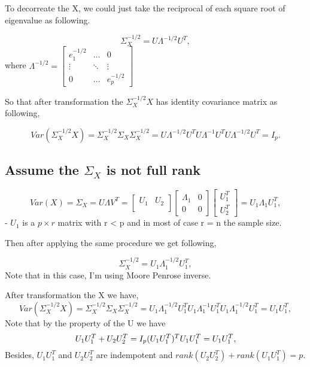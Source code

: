 \documentclass[]{article}
\begin{document}
To decorreate the X, we could just take the reciprocal of each square
root of eigenvalue as following.

\[
  \Sigma^{-1/2}_X = U\Lambda^{-1/2}U^T,
\] where
\(\Lambda^{-1/2} = \begin{bmatrix}  e_1^{-1/2} & \dots & 0 \\  \vdots & \ddots & \vdots \\  0 & \dots & e_p^{-1/2}  \end{bmatrix}\)

So that after transformation the \(\Sigma^{-1/2}_X X\) has identity
covariance matrix as following,

\[
  Var(\Sigma^{-1/2}_X X) = \Sigma^{-1/2}_X \Sigma_X\Sigma^{-1/2}_X = U\Lambda^{-1/2}U^T U\Lambda^{-1}U^T U\Lambda^{-1/2}U^T = I_p.
\]

\subsection{\texorpdfstring{Assume the \(\Sigma_X\) is not full
rank}{Assume the \textbackslash{}Sigma\_X is not full rank}}\label{assume-the-sigma_x-is-not-full-rank}

\[
  Var(X) = \Sigma_X = U\Lambda V^T =
                        \begin{bmatrix}
                         U_1 & U_2\\
                        \end{bmatrix}
                        \begin{bmatrix}
                        \Lambda_1 & 0\\
                        0 & 0
                        \end{bmatrix}
                        \begin{bmatrix}
                        U_1^T \\
                        U_2^T
                        \end{bmatrix} = U_1\Lambda_1U_1^T,
\] - \(U_1\) is a \(p \times r\) matrix with r \textless{} p and in most
of case r = n the sample size.

Then after applying the same procedure we get following,

\[
  \Sigma^{-1/2}_X = U_1\Lambda_1^{-1/2}U_1^T,
\] Note that in this case, I'm using Moore Penrose inverse.

After transformation the X we have, \[
  Var(\Sigma^{-1/2}_X X) = \Sigma^{-1/2}_X \Sigma_X\Sigma^{-1/2}_X = U_1\Lambda^{-1/2}_1U^T_1 U_1\Lambda^{-1}_1U^T_1 U_1\Lambda^{-1/2}_1U^T_1 = U_1U_1^T,  
\] Note that by the property of the U we have \[
  U_1U_1^T + U_2U_2^T = I_p \\
  (U_1U_1^T)^T U_1U_1^T = U_1U_1^T,
\] Besides, \(U_1U_1^T\) and \(U_2U_2^T\) are indempotent and
\(rank(U_2U_2^T) + rank(U_1U_1^T) = p\).
\end{document}
